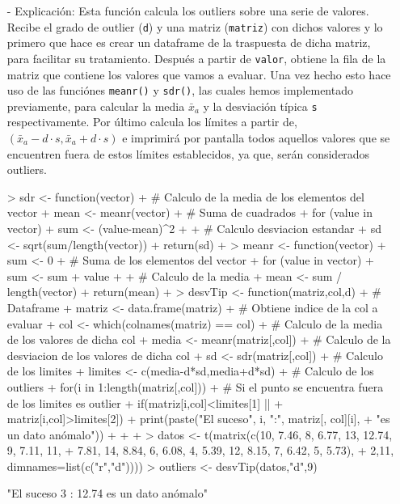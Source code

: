 \documentclass[a4paper, 12pt]{article}
\begin{document}
\begin{itemize}
\begin{itemize}
				\item[-] Explicación: Esta función calcula los outliers sobre una serie de valores. Recibe el grado de outlier (\texttt{d}) y una matriz (\texttt{matriz}) con dichos valores y lo primero que hace es crear un dataframe de la traspuesta de dicha matriz, para facilitar su tratamiento. Después a partir de \texttt{valor}, obtiene la fila de la matriz que contiene los valores que vamos a evaluar. Una vez hecho esto hace uso de las funciónes \texttt{meanr()} y \texttt{sdr()}, las cuales hemos implementado previamente, para calcular la media \texttt{$\bar{x}$$_{a}$} y la desviación típica \texttt{s} respectivamente. Por último calcula los límites a partir de, \texttt{$(\bar{x}_{a} - d \cdot s, \bar{x}_{a} + d \cdot s)$} e imprimirá por pantalla todos aquellos valores que se encuentren fuera de estos límites establecidos, ya que, serán considerados outliers.
\begin{Schunk}
\begin{Sinput}
> sdr <- function(vector) {
+     # Calculo de la media de los elementos del vector
+     mean <- meanr(vector)
+     # Suma de cuadrados
+     for (value in vector) {
+         sum <- (value-mean)^2
+     }
+     # Calculo desviacion estandar
+     sd <- sqrt(sum/length(vector))
+     return(sd)
+ }
> meanr <- function(vector) {
+   sum <- 0
+   # Suma de los elementos del vector
+   for (value in vector) {
+     sum <- sum + value
+   }
+   # Calculo de la media
+   mean <- sum / length(vector)   
+   return(mean)
+ }
> desvTip <- function(matriz,col,d){
+     # Dataframe
+     matriz <- data.frame(matriz)
+     # Obtiene indice de la col a evaluar
+     col <- which(colnames(matriz) == col)
+     # Calculo de la media de los valores de dicha col
+     media <- meanr(matriz[,col])
+     # Calculo de la desviacion de los valores de dicha col
+     sd <- sdr(matriz[,col])
+     # Calculo de los limites
+     limites <- c(media-d*sd,media+d*sd)
+     # Calculo de los outliers
+     for(i in 1:length(matriz[,col])) { 
+     # Si el punto se encuentra fuera de los limites es outlier
+         if(matriz[i,col]<limites[1] || 
+ 		matriz[i,col]>limites[2]) { 
+             print(paste("El suceso", i, ":", matriz[, col][i], 
+ 			"es un dato anómalo"))
+         }
+     }
+ }
> datos <- t(matrix(c(10, 7.46, 8, 6.77, 13, 12.74, 9, 7.11, 11, 
+ 7.81, 14, 8.84, 6, 6.08, 4, 5.39, 12, 8.15, 7, 6.42, 5, 5.73),
+ 2,11, dimnames=list(c("r","d"))))
> outliers <- desvTip(datos,"d",9)
\end{Sinput}
\begin{Soutput}
[1] "El suceso 3 : 12.74 es un dato anómalo"
\end{Soutput}
\end{Schunk}
			\end{itemize}
		\end{itemize}
		
\end{document}

